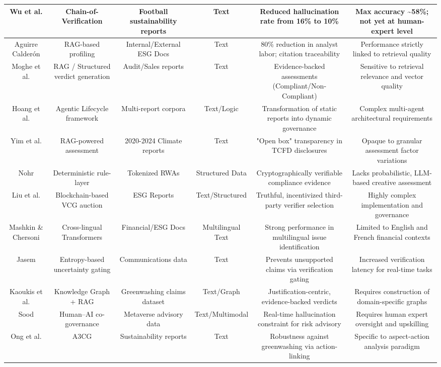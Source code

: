 \documentclass{article}
\begin{document}
\begin{table}[h!]
\begin{tabular}{|c|c|c|c|c|c|}
Wu et al.  \parencite{yue_wu_cae353aa} & Chain-of-Verification & Football sustainability reports & Text & Reduced hallucination rate from 16\% to 10\% & Max accuracy \textasciitilde{}58\%; not yet at human-expert level \\ \hline
Aguirre Calderón  \parencite{juan_aguirre_calder_n_5eae82e0} & RAG-based profiling & Internal/External ESG Docs & Text & 80\% reduction in analyst labor; citation traceability & Performance strictly linked to retrieval quality \\ \hline
Moghe et al.  \parencite{abhijeet_b__moghe_963e6c96} & RAG / Structured verdict generation & Audit/Sales reports & Text & Evidence-backed assessments (Compliant/Non-Compliant) & Sensitive to retrieval relevance and vector quality \\ \hline
Hoang et al.  \parencite{thong_hoang_d30a390b} & Agentic Lifecycle framework & Multi-report corpora & Text/Logic & Transformation of static reports into dynamic governance & Complex multi-agent architectural requirements \\ \hline
Yim et al.  \parencite{tik_yu_yim_951fa18a} & RAG-powered assessment & 2020-2024 Climate reports & Text & "Open box" transparency in TCFD disclosures & Opaque to granular assessment factor variations \\ \hline
Nohr  \parencite{steven_paul_nohr_a6874924} & Deterministic rule-layer & Tokenized RWAs & Structured Data & Cryptographically verifiable compliance evidence & Lacks probabilistic, LLM-based creative assessment \\ \hline
Liu et al.  \parencite{liyuan_liu_91c36432} & Blockchain-based VCG auction & ESG Reports & Text/Structured & Truthful, incentivized third-party verifier selection & Highly complex implementation and governance \\ \hline
Mashkin \& Chersoni  \parencite{ivan_mashkin_fba24085} & Cross-lingual Transformers & Financial/ESG Docs & Multilingual Text & Strong performance in multilingual issue identification & Limited to English and French financial contexts \\ \hline
Jasem  \parencite{al_noor_ali_aziz_jasem_af362154} & Entropy-based uncertainty gating & Communications data & Text & Prevents unsupported claims via verification gating & Increased verification latency for real-time tasks \\ \hline
Kaoukis et al.  \parencite{kaoukis__georgios_35bab107} & Knowledge Graph + RAG & Greenwashing claims dataset & Text/Graph & Justification-centric, evidence-backed verdicts & Requires construction of domain-specific graphs \\ \hline
Sood  \parencite{rohit_sood_cb3a4ead} & Human–AI co-governance & Metaverse advisory data & Text/Multimodal & Real-time hallucination constraint for risk advisory & Requires human expert oversight and upskilling \\ \hline
Ong et al.  \parencite{keane_ong_0a5de439} & A3CG & Sustainability reports & Text & Robustness against greenwashing via action-linking & Specific to aspect-action analysis paradigm \\ \hline
\end{tabular}
\end{table}
\end{document}

